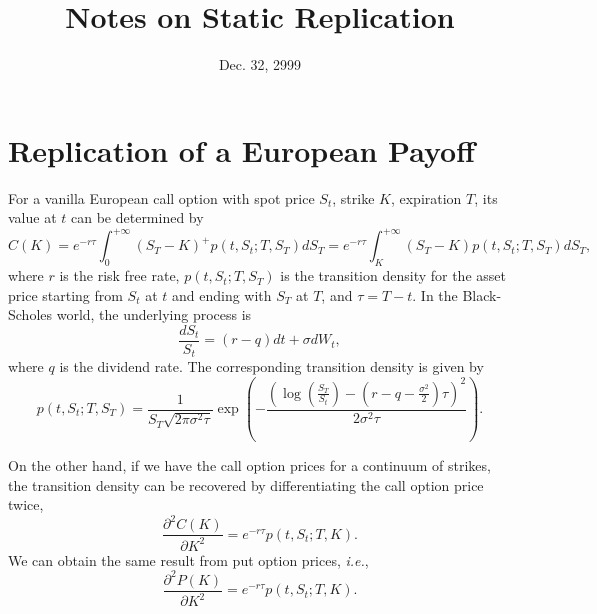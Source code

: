 \documentclass[12pt]{article}
\begin{document}
\title{Notes on Static Replication}
\date{Dec. 32, 2999}

\maketitle

\section{Replication of a European Payoff}

  For a vanilla European call option with spot price $S_t$, strike $K$, expiration $T$, its value at $t$ can be determined by
  \begin{equation}
    C(K) = e^{-r\tau}\int_{0}^{+\infty}(S_T-K)^+p(t,S_t;T,S_T)dS_T = e^{-r\tau}\int_{K}^{+\infty}(S_T-K)p(t,S_t;T,S_T)dS_T,
  \end{equation}
  where $r$ is the risk free rate, $p(t,S_t;T,S_T)$ is the transition density for the asset price starting from $S_t$ at $t$ and
  ending with $S_T$ at $T$, and $\tau=T-t$. In the Black-Scholes world, the underlying process is
  \begin{equation}
    \frac{dS_t}{S_t}=(r-q)dt+\sigma dW_t,
  \end{equation}
  where $q$ is the dividend rate. The corresponding transition density is given by
  \begin{equation}
    p(t,S_t;T,S_T)=\frac{1}{S_T\sqrt{2\pi\sigma^2\tau}}
    \exp\left(-\frac{\displaystyle \left(\log\left(\frac{S_T}{S_t}\right)-\left(r-q-\frac{\sigma^2}{2}\right)\tau\right)^2}{2\sigma^2\tau}\right).
    \label{density}
  \end{equation}

  On the other hand, if we have the call option prices for a continuum of strikes, the transition density can be recovered by
  differentiating the call option price twice,
  \begin{equation}
    \frac{\partial^2C(K)}{\partial K^2}=e^{-r\tau}p(t,S_t;T,K).
  \end{equation}
  We can obtain the same result from put option prices, {\it i.e.},
  \begin{equation}
    \frac{\partial^2P(K)}{\partial K^2}=e^{-r\tau}p(t,S_t;T,K).
  \end{equation}
\end{document}
